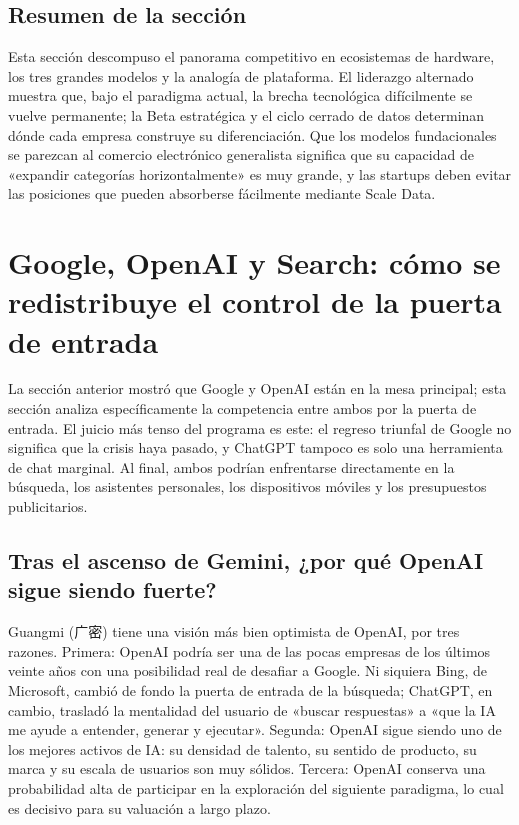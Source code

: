 \documentclass[a4paper]{article}
\begin{document}
\subsection{Resumen de la sección}

Esta sección descompuso el panorama competitivo en ecosistemas de hardware, los tres grandes modelos y la analogía de plataforma. El liderazgo alternado muestra que, bajo el paradigma actual, la brecha tecnológica difícilmente se vuelve permanente; la Beta estratégica y el ciclo cerrado de datos determinan dónde cada empresa construye su diferenciación. Que los modelos fundacionales se parezcan al comercio electrónico generalista significa que su capacidad de «expandir categorías horizontalmente» es muy grande, y las startups deben evitar las posiciones que pueden absorberse fácilmente mediante Scale Data.
\section{Google, OpenAI y Search: cómo se redistribuye el control de la puerta de entrada}

La sección anterior mostró que Google y OpenAI están en la mesa principal; esta sección analiza específicamente la competencia entre ambos por la puerta de entrada. El juicio más tenso del programa es este: el regreso triunfal de Google no significa que la crisis haya pasado, y ChatGPT tampoco es solo una herramienta de chat marginal. Al final, ambos podrían enfrentarse directamente en la búsqueda, los asistentes personales, los dispositivos móviles y los presupuestos publicitarios.

\subsection{Tras el ascenso de Gemini, ¿por qué OpenAI sigue siendo fuerte?}

Guangmi (广密) tiene una visión más bien optimista de OpenAI, por tres razones. Primera: OpenAI podría ser una de las pocas empresas de los últimos veinte años con una posibilidad real de desafiar a Google. Ni siquiera Bing, de Microsoft, cambió de fondo la puerta de entrada de la búsqueda; ChatGPT, en cambio, trasladó la mentalidad del usuario de «buscar respuestas» a «que la IA me ayude a entender, generar y ejecutar». Segunda: OpenAI sigue siendo uno de los mejores activos de IA: su densidad de talento, su sentido de producto, su marca y su escala de usuarios son muy sólidos. Tercera: OpenAI conserva una probabilidad alta de participar en la exploración del siguiente paradigma, lo cual es decisivo para su valuación a largo plazo.
\end{document}
